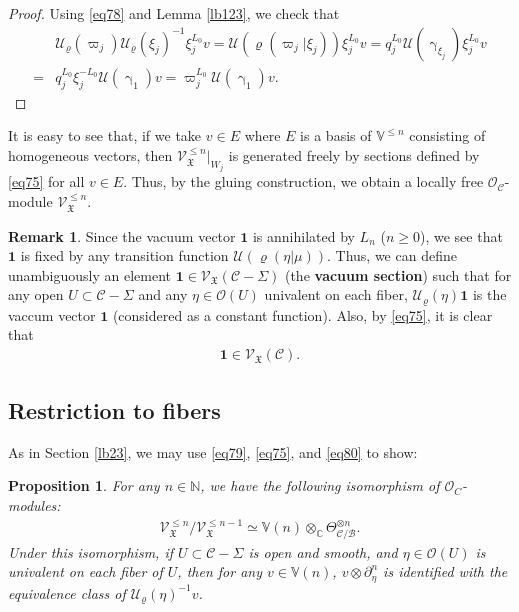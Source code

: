 \documentclass[12pt,b5paper,notitlepage]{report}
\theoremstyle{definition}
\newtheorem{rem}[df]{Remark}
\theoremstyle{plain}
\newtheorem{pp}[df]{Proposition}
\newcommand{\fk}{\mathfrak}
\newcommand{\mc}{\mathcal}
\newcommand{\id}{\mathbf{1}}
\newcommand{\scr}{\mathscr}
\newcommand{\Vbb}{\mathbb V}
\newcommand{\Cbb}{\mathbb C}
\newcommand{\Nbb}{\mathbb N}
\numberwithin{equation}{section}
\begin{document}
\begin{proof}
Using   \eqref{eq78} and Lemma \ref{lb123}, we check that
\begin{align*}
&\mc U_\varrho(\varpi_j)\mc U_\varrho(\xi_j)^{-1}\xi_j^{L_0}v=\mc U(\varrho(\varpi_j|\xi_j))\xi_j^{L_0}v=q_j^{L_0}\mc U(\upgamma_{\xi_j})\xi_j^{L_0}v\\
=&q_j^{L_0}\xi_j^{-L_0}\mc U(\upgamma_1)v=\varpi_j^{L_0}\mc U(\upgamma_1)v.
\end{align*}
\end{proof}

It is easy to see that, if we take $v\in E$ where $E$ is a basis of $\Vbb^{\leq n}$ consisting of homogeneous vectors, then $\scr V_{\fk X}^{\leq n}|_{W_j}$ is generated freely by sections defined by \eqref{eq75} for all $v\in E$. Thus, by the gluing construction, we obtain a locally free $\scr O_{\mc C}$-module $\scr V_{\fk X}^{\leq n}$.



\begin{rem}\label{lb46}
Since the vacuum vector $\id$ is annihilated by $L_n$ ($n\geq 0$), we see that $\id$ is fixed by any transition function $\mc U(\varrho(\eta|\mu))$. Thus, we can define unambiguously an element $\id\in\scr V_{\fk X}(\mc C-\Sigma)$ (the \textbf{vacuum section}) such that for any open $U\subset\mc C-\Sigma$ and any $\eta\in\scr O(U)$ univalent on each fiber, $\mc U_\varrho(\eta)\id$ is the vaccum vector $\id$ (considered as a constant function). \index{1@$\id$} Also, by \eqref{eq75}, it is clear that
\begin{align*}
\id\in\scr V_{\fk X}(\mc C).
\end{align*}
\end{rem}




\subsection*{Restriction to fibers}



As in Section \ref{lb23}, we may use \eqref{eq79}, \eqref{eq75}, and \eqref{eq80} to show:

\begin{pp}\label{lb56}
For any $n\in\Nbb$, we have the following isomorphism of  $\scr O_C$-modules:
\begin{align}
\scr V_{\fk X}^{\leq n}/\scr V_{\fk X}^{\leq n-1}\simeq\Vbb(n)\otimes_{\Cbb}\Theta_{\mc C/\mc B}^{\otimes n}.\label{eq153}
\end{align}
Under this isomorphism, if $U\subset \mc C-\Sigma$ is open and smooth, and $\eta\in\scr O(U)$ is univalent on each fiber of $U$, then for any $v\in\Vbb(n)$, $v\otimes \partial_\eta^n$ is identified with the equivalence class of $\mc U_\varrho(\eta)^{-1}v$.
\end{pp}
\end{document}
